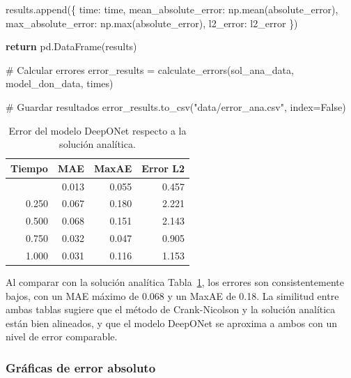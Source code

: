 \documentclass[
  spanish,
  us-letterpaper,
]{scrreprt}
\newenvironment{Shaded}{\begin{snugshade}}{\end{snugshade}}
\newcommand{\BuiltInTok}[1]{\textcolor[rgb]{0.00,0.23,0.31}{#1}}
\newcommand{\CommentTok}[1]{\textcolor[rgb]{0.37,0.37,0.37}{#1}}
\newcommand{\ControlFlowTok}[1]{\textcolor[rgb]{0.00,0.23,0.31}{\textbf{#1}}}
\newcommand{\NormalTok}[1]{\textcolor[rgb]{0.00,0.23,0.31}{#1}}
\newcommand{\OperatorTok}[1]{\textcolor[rgb]{0.37,0.37,0.37}{#1}}
\newcommand{\StringTok}[1]{\textcolor[rgb]{0.13,0.47,0.30}{#1}}
\newcommand{\VariableTok}[1]{\textcolor[rgb]{0.07,0.07,0.07}{#1}}
\theoremstyle{definition}
\theoremstyle{plain}
\theoremstyle{remark}
\begin{document}
\begin{Shaded}
\begin{Highlighting}[]
\NormalTok{        results.append(\{}
            \StringTok{\textquotesingle{}time\textquotesingle{}}\NormalTok{: time,}
            \StringTok{\textquotesingle{}mean\_absolute\_error\textquotesingle{}}\NormalTok{: np.mean(absolute\_error),}
            \StringTok{\textquotesingle{}max\_absolute\_error\textquotesingle{}}\NormalTok{: np.}\BuiltInTok{max}\NormalTok{(absolute\_error),}
            \StringTok{\textquotesingle{}l2\_error\textquotesingle{}}\NormalTok{: l2\_error}
\NormalTok{        \})}
    
    \ControlFlowTok{return}\NormalTok{ pd.DataFrame(results)}

\CommentTok{\# Calcular errores}
\NormalTok{error\_results }\OperatorTok{=}\NormalTok{ calculate\_errors(sol\_ana\_data, model\_don\_data, times)}

\CommentTok{\# Guardar resultados}
\NormalTok{error\_results.to\_csv(}\StringTok{"data/error\_ana.csv"}\NormalTok{, index}\OperatorTok{=}\VariableTok{False}\NormalTok{)}
\end{Highlighting}
\end{Shaded}

\begin{longtable}[]{@{}rrrr@{}}

\caption{\label{tbl-errores-ana}Error del modelo DeepONet respecto a la
solución analítica.}

\tabularnewline

\toprule\noalign{}
Tiempo & MAE & MaxAE & Error L2 \\
\midrule\noalign{}
\endhead
\bottomrule\noalign{}
\endlastfoot
0.000 & 0.013 & 0.055 & 0.457 \\
0.250 & 0.067 & 0.180 & 2.221 \\
0.500 & 0.068 & 0.151 & 2.143 \\
0.750 & 0.032 & 0.047 & 0.905 \\
1.000 & 0.031 & 0.116 & 1.153 \\

\end{longtable}

Al comparar con la solución analítica Tabla~\ref{tbl-errores-ana}, los
errores son consistentemente bajos, con un MAE máximo de 0.068 y un
MaxAE de 0.18. La similitud entre ambas tablas sugiere que el método de
Crank-Nicolson y la solución analítica están bien alineados, y que el
modelo DeepONet se aproxima a ambos con un nivel de error comparable.

\subsubsection{Gráficas de error
absoluto}\label{gruxe1ficas-de-error-absoluto-1}
\end{document}
